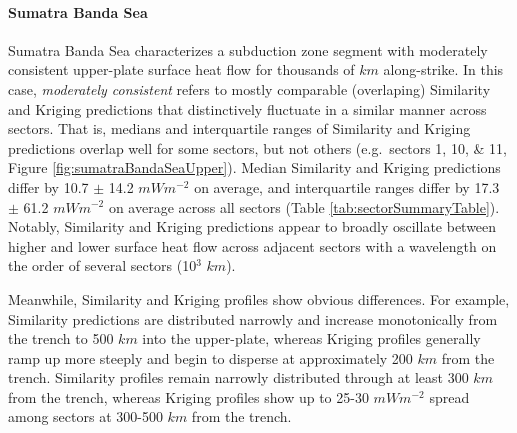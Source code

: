 \hypertarget{sumatra-banda-sea}{%
\paragraph{Sumatra Banda Sea}\label{sumatra-banda-sea}}

Sumatra Banda Sea characterizes a subduction zone segment with moderately consistent upper-plate surface heat flow for thousands of \(km\) along-strike. In this case, \emph{moderately consistent} refers to mostly comparable (overlaping) Similarity and Kriging predictions that distinctively fluctuate in a similar manner across sectors. That is, medians and interquartile ranges of Similarity and Kriging predictions overlap well for some sectors, but not others (e.g.~sectors 1, 10, \& 11, Figure \ref{fig:sumatraBandaSeaUpper}). Median Similarity and Kriging predictions differ by 10.7 \(\pm\) 14.2 \(mWm^{-2}\) on average, and interquartile ranges differ by 17.3 \(\pm\) 61.2 \(mWm^{-2}\) on average across all sectors (Table \ref{tab:sectorSummaryTable}). Notably, Similarity and Kriging predictions appear to broadly oscillate between higher and lower surface heat flow across adjacent sectors with a wavelength on the order of several sectors (10\(^3\) \(km\)).

Meanwhile, Similarity and Kriging profiles show obvious differences. For example, Similarity predictions are distributed narrowly and increase monotonically from the trench to 500 \(km\) into the upper-plate, whereas Kriging profiles generally ramp up more steeply and begin to disperse at approximately 200 \(km\) from the trench. Similarity profiles remain narrowly distributed through at least 300 \(km\) from the trench, whereas Kriging profiles show up to 25-30 \(mWm^{-2}\) spread among sectors at 300-500 \(km\) from the trench.



